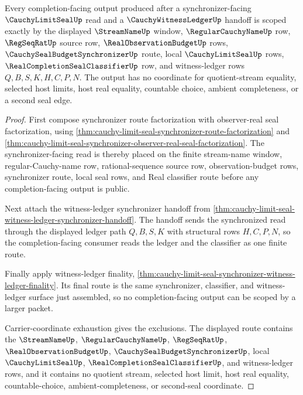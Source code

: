 \begin{theorem}
\label{thm:cauchy-limit-seal-synchronizer-witness-ledger-scope}
Every completion-facing output produced after a synchronizer-facing $\CauchyLimitSealUp$ read and a $\CauchyWitnessLedgerUp$ handoff is scoped exactly by the displayed $\StreamNameUp$ window, $\RegularCauchyNameUp$ row, $\RegSeqRatUp$ source row, $\RealObservationBudgetUp$ rows, $\CauchySealBudgetSynchronizerUp$ route, local $\CauchyLimitSealUp$ rows, $\RealCompletionSealClassifierUp$ row, and witness-ledger rows $Q,B,S,K,H,C,P,N$. The output has no coordinate for quotient-stream equality, selected host limits, host real equality, countable choice, ambient completeness, or a second seal edge.
\end{theorem}
\begin{proof}
First compose synchronizer route factorization with observer-real seal factorization, using \autoref{thm:cauchy-limit-seal-synchronizer-route-factorization} and \autoref{thm:cauchy-limit-seal-synchronizer-observer-real-seal-factorization}. The synchronizer-facing read is thereby placed on the finite stream-name window, regular-Cauchy-name row, rational-sequence source row, observation-budget rows, synchronizer route, local seal rows, and Real classifier route before any completion-facing output is public.

Next attach the witness-ledger synchronizer handoff from \autoref{thm:cauchy-limit-seal-witness-ledger-synchronizer-handoff}. The handoff sends the synchronized read through the displayed ledger path $Q,B,S,K$ with structural rows $H,C,P,N$, so the completion-facing consumer reads the ledger and the classifier as one finite route.

Finally apply witness-ledger finality, \autoref{thm:cauchy-limit-seal-synchronizer-witness-ledger-finality}. Its final route is the same synchronizer, classifier, and witness-ledger surface just assembled, so no completion-facing output can be scoped by a larger packet.

Carrier-coordinate exhaustion gives the exclusions. The displayed route contains the $\StreamNameUp$, $\RegularCauchyNameUp$, $\RegSeqRatUp$, $\RealObservationBudgetUp$, $\CauchySealBudgetSynchronizerUp$, local $\CauchyLimitSealUp$, $\RealCompletionSealClassifierUp$, and witness-ledger rows, and it contains no quotient stream, selected host limit, host real equality, countable-choice, ambient-completeness, or second-seal coordinate.
\end{proof}

